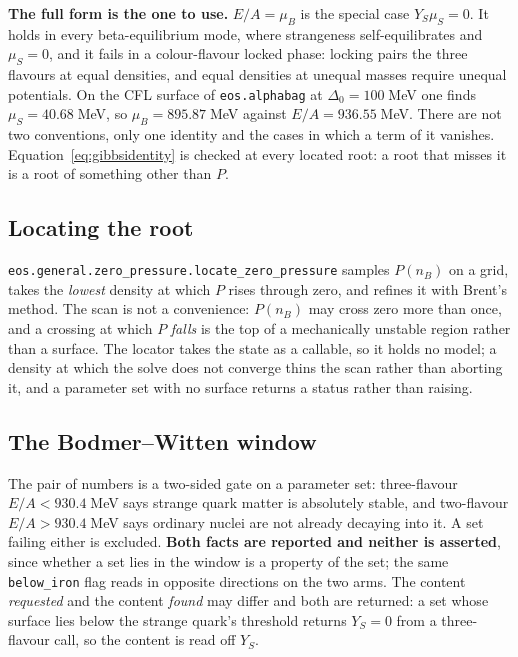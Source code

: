 \documentclass[aps,prc,onecolumn,superscriptaddress,nofootinbib,10pt]{revtex4-2}
\begin{document}
\textbf{The full form is the one to use.} $E/A = \mu_B$ is the special case
$Y_S\mu_S = 0$. It holds in every beta-equilibrium mode, where strangeness
self-equilibrates and $\mu_S = 0$, and it fails in a colour-flavour locked
phase: locking pairs the three flavours at equal densities, and equal densities
at unequal masses require unequal potentials. On the CFL surface of
\texttt{eos.alphabag} at $\Delta_0 = 100\;$MeV one finds
$\mu_S = 40.68\;$MeV, so $\mu_B = 895.87\;$MeV against
$E/A = 936.55\;$MeV. There are not two conventions, only one identity and the
cases in which a term of it vanishes. Equation~\eqref{eq:gibbsidentity} is
checked at every located root: a root that misses it is a root of something
other than $P$.

\subsection{Locating the root}

\texttt{eos.general.zero\_pressure.locate\_zero\_pressure} samples $P(n_B)$ on
a grid, takes the \emph{lowest} density at which $P$ rises through zero, and
refines it with Brent's method. The scan is not a convenience: $P(n_B)$ may
cross zero more than once, and a crossing at which $P$ \emph{falls} is the top
of a mechanically unstable region rather than a surface. The locator takes the
state as a callable, so it holds no model; a density at which the solve does
not converge thins the scan rather than aborting it, and a parameter set with
no surface returns a status rather than raising.

\subsection{The Bodmer--Witten window}

The pair of numbers is a two-sided gate on a parameter set: three-flavour
$E/A < 930.4\;$MeV says strange quark matter is absolutely stable, and
two-flavour $E/A > 930.4\;$MeV says ordinary nuclei are not already decaying
into it. A set failing either is excluded. \textbf{Both facts are reported and
neither is asserted}, since whether a set lies in the window is a property of
the set; the same \texttt{below\_iron} flag reads in opposite directions on the
two arms. The content \emph{requested} and the content \emph{found} may differ
and both are returned: a set whose surface lies below the strange quark's
threshold returns $Y_S = 0$ from a three-flavour call, so the content is read
off $Y_S$.
\end{document}
